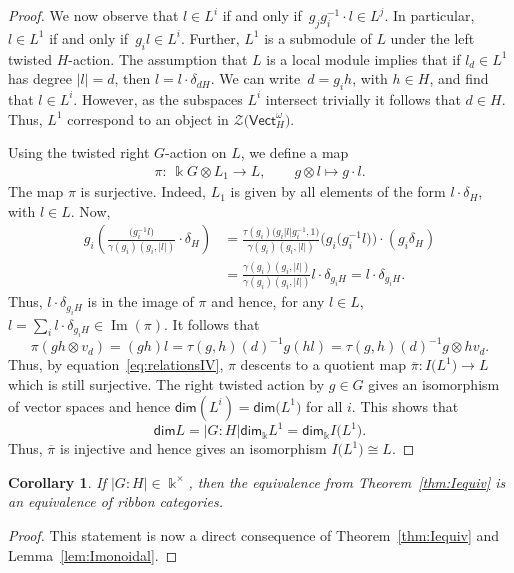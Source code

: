 \documentclass[pdftex]{sigma}
\numberwithin{equation}{section}
\newtheorem{Corollary}[Theorem]{Corollary}
\newcommand{\ov}[1]{\overline{#1}}
\newcommand{\Img}{\operatorname{Im}}
\renewcommand{\dim}{\mathsf{dim}}
\newcommand{\Vect}{\mathsf{Vect}}
\newcommand{\cZ}{\mathcal{Z}}
\begin{document}
\begin{proof}
We now observe that $l\in L^i$ if and only if~$g_jg_i^{-1}\cdot l\in L^j$. In particular, $l\in L^1$ if and only if~$g_il \in L^i$. Further, $L^1$ is a submodule of $L$ under the left twisted $H$-action. The assumption that $L$ is a local module implies that if $l_d\in L^1$ has degree $|l|=d$, then
$l=l\cdot \delta_{dH}$. We can write~$d=g_i h$, with $h\in H$, and find that $l\in L^i$. However, as the subspaces $L^i$ intersect trivially it follows that $d\in H$. Thus, $L^1$ correspond to an object in $\cZ\big(\Vect_H^\omega\big)$.

Using the twisted right $G$-action on $L$, we define a map
\begin{align*}
\pi\colon\ \Bbbk G \otimes L_1 \longrightarrow L, \qquad
g \otimes l \mapsto g\cdot l.
\end{align*}
The map $\pi$ is surjective. Indeed, $L_1$ is given by all elements of the form $l\cdot \delta_{H}$, with $l\in L$. Now,
\begin{align*}
g_i \left(\frac{\big(g_i^{-1}l\big)}{\gamma(g_i)(g_i,|l|)}\cdot \delta_{H}\right)&=\frac{\tau(g_i)\big(g_i|l|g_i^{-1},1\big)}{\gamma(g_i)(g_i,|l|)}\big(g_i\big(g_i^{-1}l\big)\big)\cdot (g_i\delta_{H})\\
&=\frac{\gamma(g_i)(g_i,|l|)}{\gamma(g_i)(g_i,|l|)}l\cdot \delta_{g_iH}=l\cdot \delta_{g_iH}.
\end{align*}
Thus, $l\cdot \delta_{g_iH}$ is in the image of $\pi$ and hence, for any $l\in L$,
$l=\sum_i l\cdot \delta_{g_iH}\in \Img(\pi).$
It follows that
\[\pi(gh \otimes v_d)=(gh)l=\tau(g,h)(d)^{-1}g(hl)= \tau(g,h)(d)^{-1}g \otimes h v_d.\]
Thus, by equation~\eqref{eq:relationsIV}, $\pi$ descents to a quotient map
$\ov{\pi}\colon I\big(L^1\big) \to L$
which is still surjective. The right twisted action by $g\in G$ gives an isomorphism of vector spaces and hence $\dim(L^i)=\dim\big(L^1\big)$ for all $i$. This shows that
\[\dim L = |G:H|\dim_\Bbbk L^1=\dim_\Bbbk I\big(L^1\big).\]
Thus, $\ov{\pi}$ is injective and hence gives an isomorphism $I\big(L^1\big)\cong L$.
\end{proof}

\begin{Corollary}
If $|G:H|\in \Bbbk^\times$, then the equivalence from Theorem~{\rm \ref{thm:Iequiv}} is an equivalence of ribbon categories.
\end{Corollary}
\begin{proof}
This statement is now a direct consequence of Theorem~\ref{thm:Iequiv} and Lemma~\ref{lem:Imonoidal}.
\end{proof}
\end{document}
